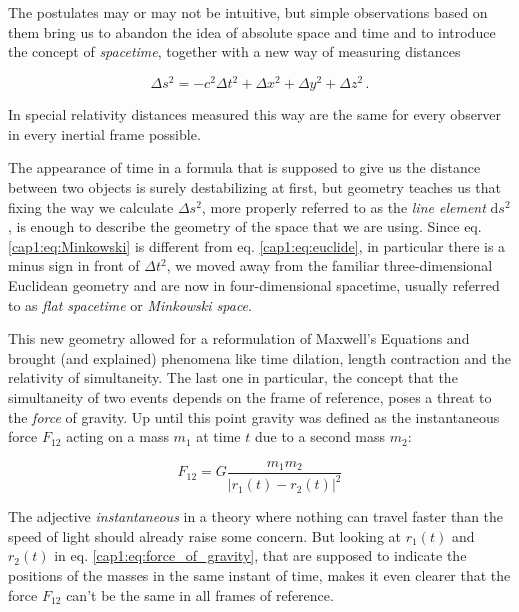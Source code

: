 The postulates may or may not be intuitive, but simple observations based on
them bring us to abandon the idea of absolute space and time and to introduce
the concept of \textit{spacetime}, together with a new way of measuring
distances

\begin{equation}
    \Delta s^2 = - c^2 \Delta t^2 + \Delta x^2 + \Delta y^2 + \Delta z^2 \, .
    \label{cap1:eq:Minkowski}
\end{equation}

In special relativity distances measured this way are the same for every
observer in every inertial frame possible.

The appearance of time in a formula that is supposed to give us the distance
between two objects is surely destabilizing at first, but geometry teaches us
that fixing the way we calculate $\Delta s^2$, more properly referred to as the
\textit{line element} $\mathrm{d}s^2$, is enough to describe the geometry of
the space that we are using.
Since eq. \ref{cap1:eq:Minkowski} is different from eq. \ref{cap1:eq:euclide}, in
particular there is a minus sign in front of $\Delta t^2$, we moved away from
the familiar three-dimensional Euclidean geometry and are now in
four-dimensional spacetime, usually referred to as \textit{flat spacetime} or
\textit{Minkowski space}.

This new geometry allowed for a reformulation of Maxwell's Equations and
brought (and explained) phenomena like time dilation, length contraction and the
relativity of simultaneity.
The last one in particular, the concept that the simultaneity of two events
depends on the frame of reference, poses a threat to the \textit{force} of
gravity.
Up until this point gravity was defined as the instantaneous force $F_{12}$
acting on a mass $m_1$ at time $t$ due to a second mass $m_2$:

\begin{equation}
    F_{12} = G \frac{m_1 m_2}{|r_1(t) - r_2(t)|^2}
    \label{cap1:eq:force_of_gravity}
\end{equation}

The adjective \textit{instantaneous} in a theory where nothing can travel
faster than the speed of light should already raise some concern.
But looking at $r_1(t)$ and $r_2(t)$ in eq. \ref{cap1:eq:force_of_gravity}, that are
supposed to indicate the positions of the masses in the same instant of time,
makes it even clearer that the force $F_{12}$ can't be the same in all
frames of reference.

